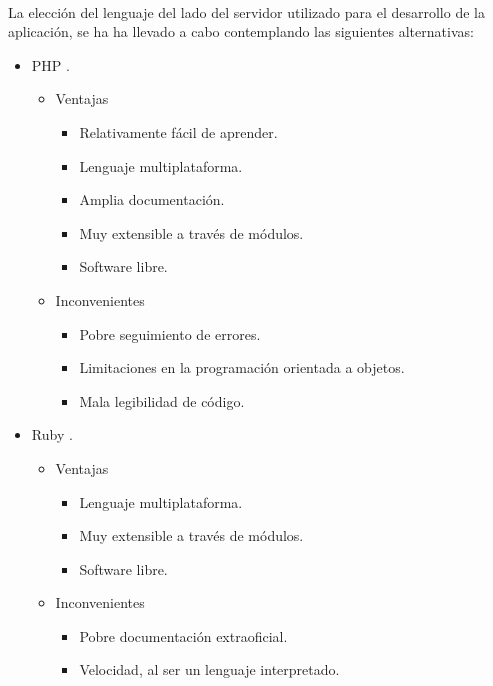    \paragraph{}La elección del lenguaje del lado del servidor utilizado para el
   desarrollo de la aplicación, se ha ha llevado a cabo contemplando las
   siguientes alternativas:
   \begin{itemize}
    \item PHP \cite{php}.
      \begin{itemize}
         \item Ventajas
            \begin{itemize}
             \item Relativamente fácil de aprender.
             \item Lenguaje multiplataforma.
             \item Amplia documentación.
             \item Muy extensible a través de módulos.
             \item Software libre.
            \end{itemize}
         \item Inconvenientes
            \begin{itemize}
             \item Pobre seguimiento de errores.
             \item Limitaciones en la programación orientada a objetos.
             \item Mala legibilidad de código.
            \end{itemize}
      \end{itemize}
    \item Ruby \cite{ruby}.
      \begin{itemize}
         \item Ventajas
            \begin{itemize}
             \item Lenguaje multiplataforma.
             \item Muy extensible a través de módulos.
             \item Software libre.
            \end{itemize}
         \item Inconvenientes
            \begin{itemize}
             \item Pobre documentación extraoficial.
             \item Velocidad, al ser un lenguaje interpretado.

\end{itemize}
\end{itemize}
\end{itemize}
